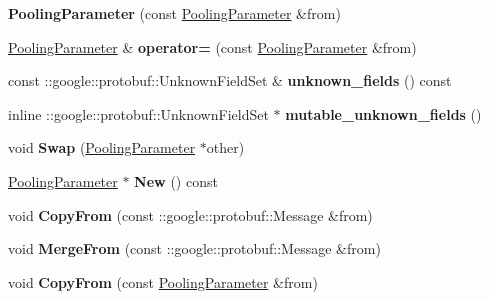 \begin{DoxyCompactItemize}
{\bfseries Pooling\+Parameter} (const \mbox{\hyperlink{classcaffe_1_1_pooling_parameter}{Pooling\+Parameter}} \&from)
\item 
\mbox{\label{classcaffe_1_1_pooling_parameter_a0d92205f73afe0747a94092b03003ef4}} 
\mbox{\hyperlink{classcaffe_1_1_pooling_parameter}{Pooling\+Parameter}} \& {\bfseries operator=} (const \mbox{\hyperlink{classcaffe_1_1_pooling_parameter}{Pooling\+Parameter}} \&from)
\item 
\mbox{\label{classcaffe_1_1_pooling_parameter_aad96e4c7902476a51161365a5ec54ddf}} 
const \+::google\+::protobuf\+::\+Unknown\+Field\+Set \& {\bfseries unknown\+\_\+fields} () const
\item 
\mbox{\label{classcaffe_1_1_pooling_parameter_ac314d18c39cf12c9a8fefcde0a94d125}} 
inline \+::google\+::protobuf\+::\+Unknown\+Field\+Set $\ast$ {\bfseries mutable\+\_\+unknown\+\_\+fields} ()
\item 
\mbox{\label{classcaffe_1_1_pooling_parameter_a887875fae056125f70fe7aba0ab89d74}} 
void {\bfseries Swap} (\mbox{\hyperlink{classcaffe_1_1_pooling_parameter}{Pooling\+Parameter}} $\ast$other)
\item 
\mbox{\label{classcaffe_1_1_pooling_parameter_a6ae77ee1d989f3f5963e57a1fca4fa36}} 
\mbox{\hyperlink{classcaffe_1_1_pooling_parameter}{Pooling\+Parameter}} $\ast$ {\bfseries New} () const
\item 
\mbox{\label{classcaffe_1_1_pooling_parameter_ae588669a2c93ce4d8952f28f78ca8a2f}} 
void {\bfseries Copy\+From} (const \+::google\+::protobuf\+::\+Message \&from)
\item 
\mbox{\label{classcaffe_1_1_pooling_parameter_a9ce3fef3800f5474bb8008d60314103b}} 
void {\bfseries Merge\+From} (const \+::google\+::protobuf\+::\+Message \&from)
\item 
\mbox{\label{classcaffe_1_1_pooling_parameter_a48419e11585905cd81c394cbc6b5f068}} 
void {\bfseries Copy\+From} (const \mbox{\hyperlink{classcaffe_1_1_pooling_parameter}{Pooling\+Parameter}} \&from)

\end{DoxyCompactItemize}

